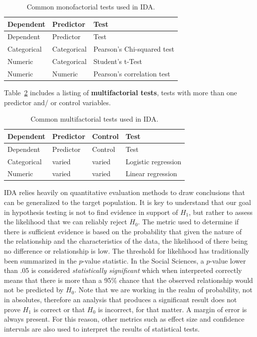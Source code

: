 \documentclass[
  letterpaper,
  DIV=11,
  numbers=noendperiod]{scrreport}
\theoremstyle{definition}
\theoremstyle{remark}
\begin{document}
\hypertarget{tbl-ida-methods-monofactorial}{}
\begin{longtable}[]{@{}lll@{}}
\caption{\label{tbl-ida-methods-monofactorial}Common monofactorial tests
used in IDA.}\tabularnewline
\toprule\noalign{}
Dependent & Predictor & Test \\
\midrule\noalign{}
\endfirsthead
\toprule\noalign{}
Dependent & Predictor & Test \\
\midrule\noalign{}
\endhead
\bottomrule\noalign{}
\endlastfoot
Categorical & Categorical & Pearson's Chi-squared test \\
Numeric & Categorical & Student's t-Test \\
Numeric & Numeric & Pearson's correlation test \\
\end{longtable}

Table~\ref{tbl-ida-methods-multifactorial} includes a listing of
\textbf{multifactorial tests}, tests with more than one predictor and/
or control variables.

\hypertarget{tbl-ida-methods-multifactorial}{}
\begin{longtable}[]{@{}llll@{}}
\caption{\label{tbl-ida-methods-multifactorial}Common multifactorial
tests used in IDA.}\tabularnewline
\toprule\noalign{}
Dependent & Predictor & Control & Test \\
\midrule\noalign{}
\endfirsthead
\toprule\noalign{}
Dependent & Predictor & Control & Test \\
\midrule\noalign{}
\endhead
\bottomrule\noalign{}
\endlastfoot
Categorical & varied & varied & Logistic regression \\
Numeric & varied & varied & Linear regression \\
\end{longtable}

IDA relies heavily on quantitative evaluation methods to draw
conclusions that can be generalized to the target population. It is key
to understand that our goal in hypothesis testing is not to find
evidence in support of \(H_1\), but rather to assess the likelihood that
we can reliably reject \(H_0\). The metric used to determine if there is
sufficient evidence is based on the probability that given the nature of
the relationship and the characteristics of the data, the likelihood of
there being no difference or relationship is low. The threshold for
likelihood has traditionally been summarized in the \(p\)-value
statistic. In the Social Sciences, a \(p\)-value lower than .05 is
considered \emph{statistically significant} which when interpreted
correctly means that there is more than a 95\% chance that the observed
relationship would not be predicted by \(H_0\). Note that we are working
in the realm of probability, not in absolutes, therefore an analysis
that produces a significant result does not prove \(H_1\) is correct or
that \(H_0\) is incorrect, for that matter. A margin of error is always
present. For this reason, other metrics such as effect size and
confidence intervals are also used to interpret the results of
statistical tests.
\end{document}
